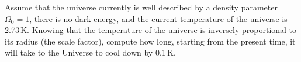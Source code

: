 Assume that the universe currently is well described by a density parameter
$\Omega_0 = 1$, there is no dark energy, and the current temperature of the
universe is 2.73\,K. Knowing that the temperature of the universe is inversely
proportional to its radius (the scale factor), compute how long, starting from
the present time, it will take to the Universe to cool down by 0.1\,K.
